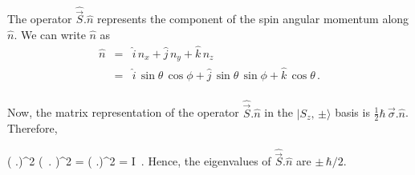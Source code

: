 The operator $\hat{\vec{S}}.\hat{n}$ represents the component of the spin angular momentum along $\hat{n}$. We can write $\hat{n}$ as
\begin{eqnarray}
\hat{n} & = & \hat{i}\,n_x + \hat{j}\, n_y + \hat{k}\, n_z \nonumber \\
& = & \hat{i}\, \sin\theta\, \cos \phi + \hat{j}\, \sin\theta\, \sin \phi + \hat{k}\, \cos\theta \, . 
\label{eq:nhat}
\end{eqnarray}

\paragraph{}
Now, the matrix representation of the operator $\hat{\vec{S}}.\hat{n}$ in the $|S_z,\,\pm\rangle$ basis is 
$\frac{1}{2} \hbar\, \vec{\sigma}.\hat{n}$. Therefore,

\be
\left( .\right)^2  \left(\hbar\, \vec{\sigma}. \right)^2
=  \left( \vec{\sigma}.\right)^2 =  I\, .
\ee
Hence, the eigenvalues of $\hat{\vec{S}}.\hat{n}$ are $\pm \, \hbar/2$.

